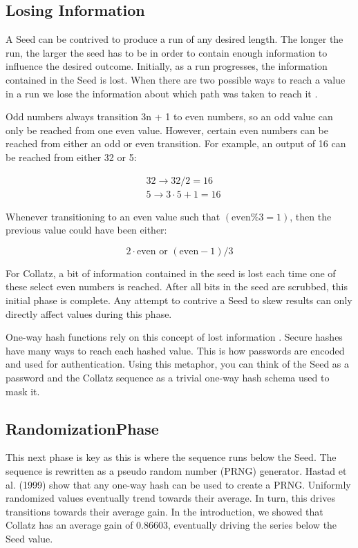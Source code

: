 \documentclass[preprint,natbib]{sigplanconf}
\begin{document}
\subsection{Losing Information}
A Seed can be contrived to produce a run of any desired length. The longer the run, the larger the seed has to be in order to contain enough information to influence the desired outcome. Initially, as a run progresses, the information contained in the Seed is lost. When there are two possible ways to reach a value in a run we lose the information about which path was taken to reach it \cite{2}.

Odd numbers always transition 3n + 1 to even numbers, so an odd value can only be reached from one even value. However, certain even numbers can be reached from either an odd or even transition. For example, an output of 16 can be reached from either 32 or 5:

\[
    \begin{aligned}
         & 32 \rightarrow 32 / 2 = 16     \\
         & 5 \rightarrow 3\cdot5 + 1 = 16
    \end{aligned}
\]

Whenever transitioning to an even value such that $(\text{even} \% 3 = 1)$, then the previous value could have been either:

\[
    2 \cdot \text{even or } (\text{even} - 1) / 3
\]

For Collatz, a bit of information contained in the seed is lost each time one of these select even numbers is reached. After all bits in the seed are scrubbed, this initial phase is complete. Any attempt to contrive a Seed to skew results can only directly affect values during this phase.

One-way hash functions rely on this concept of lost information \cite{3}. Secure hashes have many ways to reach each hashed value. This is how passwords are encoded and used for authentication. Using this metaphor, you can think of the Seed as a password and the Collatz sequence as a trivial one-way hash schema used to mask it.

\subsection{RandomizationPhase}

This next phase is key as this is where the sequence runs below the Seed. The sequence is rewritten as a pseudo random number (PRNG) generator. Hastad et al. (1999) \cite{4} show that any one-way hash can be used to create a PRNG. Uniformly randomized values eventually trend towards their average. In turn, this drives transitions towards their average gain. In the introduction, we showed that Collatz has an average gain of $0.86603$, eventually driving the series below the Seed value.
\end{document}
